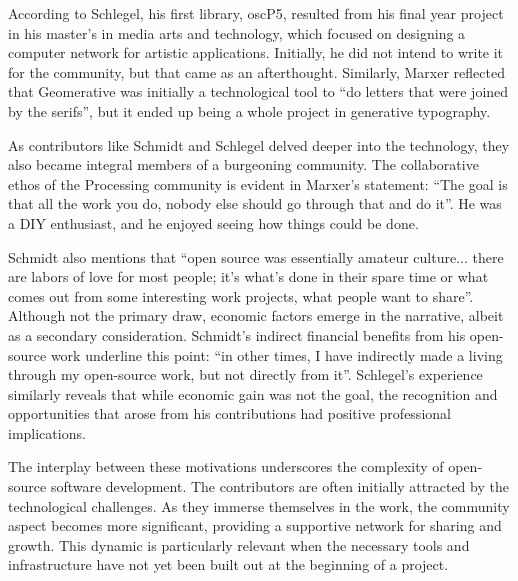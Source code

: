 According to Schlegel, his first library, oscP5, resulted from his final year project in his master’s in media arts and technology, which focused on designing a computer network for artistic applications. Initially, he did not intend to write it for the community, but that came as an afterthought. Similarly, Marxer reflected that Geomerative was initially a technological tool to \enquote{do letters that were joined by the serifs}, but it ended up being a whole project in generative typography.

As contributors like Schmidt and Schlegel delved deeper into the technology, they also became integral members of a burgeoning community. The collaborative ethos of the Processing community is evident in Marxer’s statement: \enquote{The goal is that all the work you do, nobody else should go through that and do it}. He was a DIY enthusiast, and he enjoyed seeing how things could be done. 

Schmidt also mentions that \enquote{open source was essentially amateur culture... there are labors of love for most people; it’s what’s done in their spare time or what comes out from some interesting work projects, what people want to share}. Although not the primary draw, economic factors emerge in the narrative, albeit as a secondary consideration. Schmidt’s indirect financial benefits from his open-source work underline this point: \enquote{in other times, I have indirectly made a living through my open-source work, but not directly from it}. Schlegel’s experience similarly reveals that while economic gain was not the goal, the recognition and opportunities that arose from his contributions had positive professional implications.

The interplay between these motivations underscores the complexity of open-source software development. The contributors are often initially attracted by the technological challenges. As they immerse themselves in the work, the community aspect becomes more significant, providing a supportive network for sharing and growth. This dynamic is particularly relevant when the necessary tools and infrastructure have not yet been built out at the beginning of a project.


